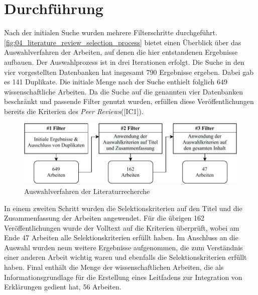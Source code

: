 \section{Durchführung}


Nach der initialen Suche wurden mehrere Filterschritte durchgeführt. \autoref{fig:04_literature_review_selection_process} bietet einen Überblick über das Auswahlverfahren der Arbeiten, auf denen die hier entstandenen Ergebnisse aufbauen. Der Auswahlprozess ist in drei Iterationen erfolgt. Die Suche in den vier vorgestellten Datenbanken hat insgesamt 790 Ergebnisse ergeben. Dabei gab es 141 Duplikate. Die initiale Menge nach der Suche enthielt folglich 649 wissenschaftliche Arbeiten. Da die Suche auf die genannten vier Datenbanken beschränkt und passende Filter genutzt wurden, erfüllen diese Veröffentlichungen bereits die Kriterien des \textit{Peer Reviews}([IC1]).

\begin{figure}[htb]
    \centering
    \includegraphics[width=\textwidth]{contents/04_literature_review/res/selection_process.pdf}
    \caption{Auswahlverfahren der Literaturrecherche}
    \label{fig:04_literature_review_selection_process}
\end{figure}

In einem zweiten Schritt wurden die Selektionskriterien auf den Titel und die Zusammenfassung der Arbeiten angewendet. Für die übrigen 162 Veröffentlichungen wurde der Volltext auf die Kriterien überprüft, wobei am Ende 47 Arbeiten alle Selektionskriterien erfüllt haben. Im Anschluss an die Auswahl wurden neun weitere Ergebnisse aufgenommen, die zum Verständnis einer anderen Arbeit wichtig waren und ebenfalls die Selektionskriterien erfüllt haben. Final enthält die Menge der wissenschaftlichen Arbeiten, die als Informationsgrundlage für die Erstellung eines Leitfadens zur Integration von Erklärungen gedient hat, 56 Arbeiten.